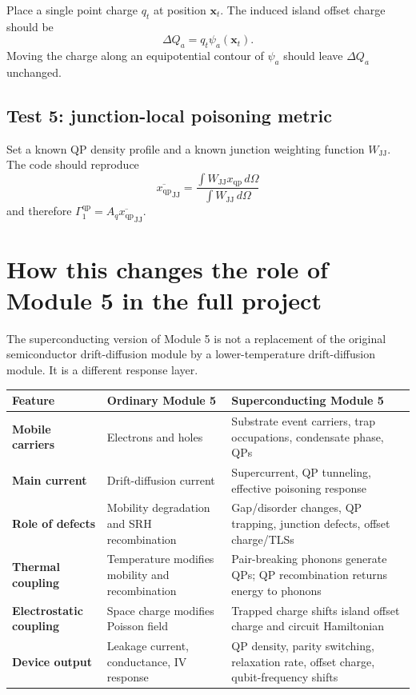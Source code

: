 \documentclass[11pt]{article}
\newcommand{\Om}{\Omega}
\newcommand{\x}{\bm{x}}
\newcommand{\xqp}{x_{\mathrm{qp}}}
\newcommand{\wpot}{\psi}
\begin{document}
Place a single point charge \(q_t\) at position \(\x_t\). The induced island offset charge should be
\begin{equation}
\Delta Q_a=q_t\wpot_a(\x_t).
\end{equation}
Moving the charge along an equipotential contour of \(\wpot_a\) should leave \(\Delta Q_a\) unchanged.

\subsection{Test 5: junction-local poisoning metric}

Set a known QP density profile and a known junction weighting function \(W_{\mathrm{JJ}}\). The code should reproduce
\begin{equation}
\overline{\xqp}_{\mathrm{JJ}}=\frac{\int W_{\mathrm{JJ}}\xqp\,d\Om}{\int W_{\mathrm{JJ}}\,d\Om}
\end{equation}
and therefore \(\Gamma_1^{\mathrm{qp}}=A_q\overline{\xqp}_{\mathrm{JJ}}\).

\section{How this changes the role of Module 5 in the full project}

The superconducting version of Module 5 is not a replacement of the original semiconductor drift-diffusion module by a lower-temperature drift-diffusion module. It is a different response layer.

\begin{center}
\begin{tabularx}{\textwidth}{>{\bfseries}p{}XX}
\toprule
Feature & Ordinary Module 5 & Superconducting Module 5 \\
\midrule
Mobile carriers & Electrons and holes & Substrate event carriers, trap occupations, condensate phase, QPs \\
Main current & Drift-diffusion current & Supercurrent, QP tunneling, effective poisoning response \\
Role of defects & Mobility degradation and SRH recombination & Gap/disorder changes, QP trapping, junction defects, offset charge/TLSs \\
Thermal coupling & Temperature modifies mobility and recombination & Pair-breaking phonons generate QPs; QP recombination returns energy to phonons \\
Electrostatic coupling & Space charge modifies Poisson field & Trapped charge shifts island offset charge and circuit Hamiltonian \\
Device output & Leakage current, conductance, IV response & QP density, parity switching, relaxation rate, offset charge, qubit-frequency shifts \\
\bottomrule
\end{tabularx}
\end{center}
\end{document}
